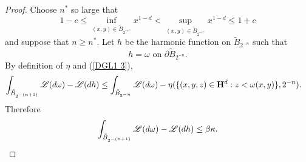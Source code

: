 \begin{proof}
Choose $n^*$ so large that
\begin{equation}\label{x to c}
1 - c \leq \inf_{(x, y) \in \tilde B_{2^{-n^*}}} x^{1 - d} < \sup_{(x, y) \in \tilde B_{2^{-n^*}}} x^{1 - d} \leq 1 + c
\end{equation}
and suppose that $n \geq n^*$.
Let $h$ be the harmonic function on $\tilde B_{2^{-n}}$ such that
\begin{equation}\label{trace equation}
h = \omega \text{ on } \partial \tilde B_{2^{-n}}.
\end{equation}
By definition of $\eta$ and (\ref{DGL1 3}),
\begin{align*}
\int_{\tilde B_{2^{-(n + 1)}}} \mathscr L(d\omega) - \mathscr L(dh)
&\leq \int_{\tilde B_{2^{-n}}} \mathscr L(d\omega) - \eta(\{(x, y, z) \in \mathbf H^d: z < \omega(x, y)\}, 2^{-n}).
\end{align*}
Therefore
\begin{equation}\label{bound on domega - dh}
\int_{\tilde B_{2^{-(n + 1)}}} \mathscr L(d\omega) - \mathscr L(dh) \leq \beta\kappa.
\end{equation}


\end{proof}
